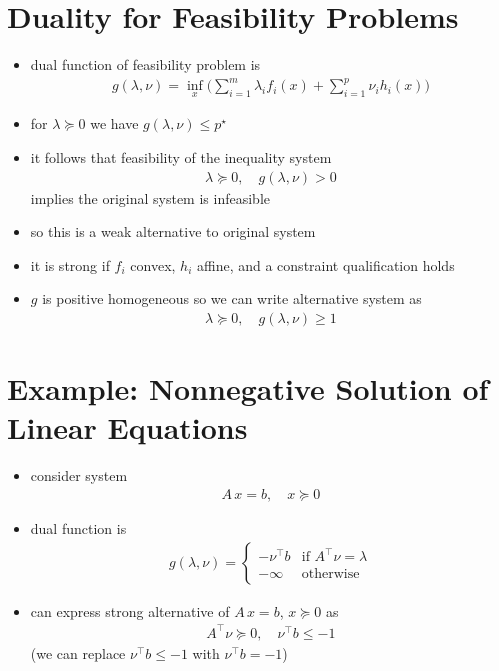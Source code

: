 \documentclass[11pt]{extarticle}
\newcommand{\ds}{\displaystyle}
\theoremstyle{definition}
\begin{document}
\newpage

\section*{Duality for Feasibility Problems}
\begin{itemize}\setlength\itemsep{0em}
  \item dual function of feasibility problem is
    \begin{align*}
      g(\lambda,\nu) = \inf_x\bigg(\sum_{i = 1}^m\lambda_i f_i(x) + \sum_{i = 1}^p \nu_i h_i(x)\bigg)
    \end{align*}
  \item for $\ds\lambda\succcurlyeq 0$ we have $\ds g(\lambda,\nu)\leqslant p^\star$
  \item it follows that feasibility of the inequality system
    \begin{align*}
      \lambda\succcurlyeq 0,\quad g(\lambda,\nu) > 0
    \end{align*}
    implies the original system is infeasible
  \item so this is a weak alternative to original system
  \item it is strong if $f_i$ convex, $h_i$ affine, and a constraint qualification holds
  \item $g$ is positive homogeneous so we can write alternative system as 
    \begin{align*}
      \lambda\succcurlyeq 0,\quad g(\lambda,\nu)\geqslant 1 
    \end{align*}
\end{itemize}

\newpage

\section*{Example: Nonnegative Solution of Linear Equations}

\begin{itemize}
  \item consider system 
    \begin{align*}
      A\,x = b,\quad x\succcurlyeq 0
    \end{align*}
  \item dual function is
    \begin{align*}
      g(\lambda,\nu) = \begin{cases}-\nu^\top b & \text{if } A^\top\nu = \lambda \\ -\infty & \text{otherwise} \end{cases} 
    \end{align*}
  \item can express strong alternative of $\ds A\,x = b$, $\ds x\succcurlyeq 0$ as
    \begin{align*}
      A^\top\nu\succcurlyeq 0,\quad \nu^\top b\leqslant -1
    \end{align*}
    (we can replace $\ds\nu^\top b\leqslant -1$ with $\ds\nu^\top b = -1$)
\end{itemize}
\end{document}
